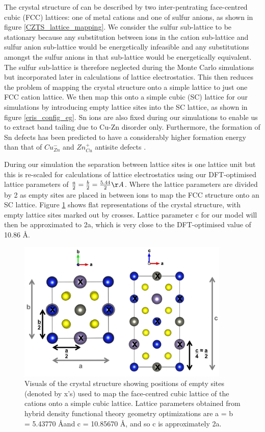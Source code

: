 The crystal structure of {\CZTS } can be described by two inter-pentrating face-centred cubic (FCC) lattices: one of metal cations and one of sulfur anions, as shown in figure \ref{CZTS_lattice_mapping}. We consider the sulfur sub-lattice to be stationary because any substitution between ions in the cation sub-lattice and sulfur anion sub-lattice would be energetically infeasible and any substitutions amongst the sulfur anions in that sub-lattice would be energetically equivalent. The sulfur sub-lattice is therefore neglected during the Monte Carlo simulations but incorporated later in calculations of lattice electrostatics. This then reduces the problem of mapping the {\CZTS } crystal structure onto a simple lattice to just one FCC cation lattice. We then map this onto a simple cubic (SC) lattice for our simulations by introducing empty lattice sites into the SC lattice, as shown in figure \ref{eris_config_eg}. Sn ions are also fixed during our simulations to enable us to extract band tailing due to Cu-Zn disorder only. Furthermore, the formation of Sn defects has been predicted to have a considerably higher formation energy than that of $Cu_{Zn}^-$ and $Zn_{Cu}^+$ antisite defects \cite{defect1}.

During our simulation the separation between lattice sites is one lattice unit but this is re-scaled for calculations of lattice electrostatics using our DFT-optimised lattice parameters of $\frac{a}{2}  = \frac{b}{2} = \frac{5.44}{2} \AA$. Where the lattice parameters are divided by 2 as empty sites are placed in between ions to map the FCC structure onto an SC lattice. Figure \ref{CZTS_lattice_scaling} shows flat representations of the crystal structure, with empty lattice sites marked out by crosses. Lattice parameter c for our model will then be approximated to 2a, which is very close to the DFT-optimised value of 10.86 \AA .  

\begin{figure}[h!]
  \centering
    \includegraphics[width=0.9\textwidth]{figures/CZTS_lattice_scaling.png}
    \caption{Visuals of the { \CZTS } crystal structure showing positions of empty sites (denoted by x's) used to map the face-centred cubic lattice of the cations onto a simple cubic lattice. Lattice parameters obtained from hybrid density functional theory geometry optimizations are a = b = 5.43770 \AA and c = 10.85670 \AA, and so c is approximately 2a.}
  \label{CZTS_lattice_scaling}
\end{figure}


